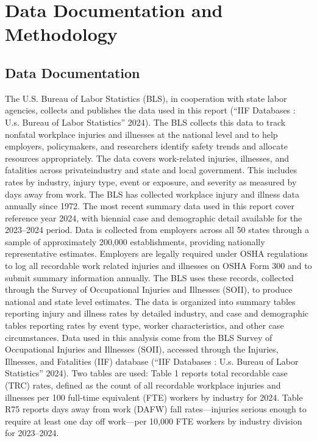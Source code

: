 \documentclass[
  letterpaper,
  DIV=11,
  numbers=noendperiod]{scrreprt}
\begin{document}

\chapter{Data Documentation and Methodology}\label{sec-data-doc}

\section{Data Documentation}\label{data-documentation}

The U.S. Bureau of Labor Statistics (BLS), in cooperation with state
labor agencies, collects and publishes the data used in this report
({``{IIF} Databases : U.s. Bureau of Labor Statistics''} 2024). The BLS
collects this data to track nonfatal workplace injuries and illnesses at
the national level and to help employers, policymakers, and researchers
identify safety trends and allocate resources appropriately. The data
covers work-related injuries, illnesses, and fatalities across
privateindustry and state and local government. This includes rates by
industry, injury type, event or exposure, and severity as measured by
days away from work. The BLS has collected workplace injury and illness
data annually since 1972. The most recent summary data used in this
report cover reference year 2024, with biennial case and demographic
detail available for the 2023--2024 period. Data is collected from
employers across all 50 states through a sample of approximately 200,000
establishments, providing nationally representative estimates. Employers
are legally required under OSHA regulations to log all recordable work
related injuries and illnesses on OSHA Form 300 and to submit summary
information annually. The BLS uses these records, collected through the
Survey of Occupational Injuries and Illnesses (SOII), to produce
national and state level estimates. The data is organized into summary
tables reporting injury and illness rates by detailed industry, and case
and demographic tables reporting rates by event type, worker
characteristics, and other case circumstances. Data used in this
analysis come from the BLS Survey of Occupational Injuries and Illnesses
(SOII), accessed through the Injuries, Illnesses, and Fatalities (IIF)
database ({``{IIF} Databases : U.s. Bureau of Labor Statistics''} 2024).
Two tables are used: Table 1 reports total recordable case (TRC) rates,
defined as the count of all recordable workplace injuries and illnesses
per 100 full-time equivalent (FTE) workers by industry for 2024. Table
R75 reports days away from work (DAFW) fall rates---injuries serious
enough to require at least one day off work---per 10,000 FTE workers by
industry division for 2023--2024.
\end{document}
